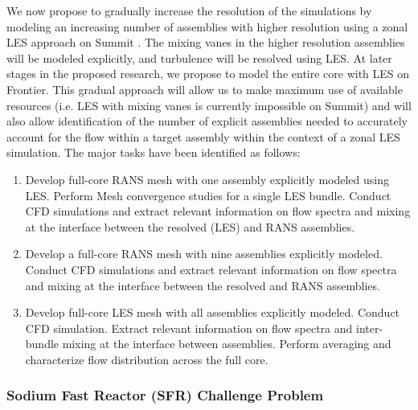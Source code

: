 We now propose to gradually increase the resolution of the simulations by modeling an increasing number of assemblies with higher resolution using a zonal LES approach on Summit \cite{menter2012global}. The mixing vanes in the higher resolution assemblies will be modeled explicitly, and turbulence will be resolved using LES. At later stages in the proposed research, we propose to model the entire core with LES on Frontier. This gradual approach will allow us to make maximum use of available resources (i.e. LES with mixing vanes is currently impossible on Summit) and will also allow identification of the number of explicit assemblies needed to accurately account for the flow within a target assembly within the context of a zonal LES simulation. The major tasks have been identified as follows:

\vspace{-.15in}
\begin{enumerate}[label=\textbf{\Roman*}]
\item Develop full-core RANS mesh with one assembly explicitly modeled using
LES.  Perform Mesh convergence studies for a single LES bundle. Conduct CFD
simulations and extract relevant information on flow spectra and mixing at the
interface between the resolved (LES) and RANS assemblies.
\item Develop a full-core RANS mesh with nine assemblies explicitly modeled. Conduct CFD simulations and extract relevant information on flow spectra and mixing at the interface 
between the resolved and RANS assemblies.
\item Develop full-core LES mesh with all assemblies explicitly modeled.
Conduct CFD simulation. Extract relevant information on flow spectra and 
inter-bundle mixing at the interface between assemblies. Perform averaging and
characterize flow distribution across the full core.
\end{enumerate}
\vspace{-.15in}


\vspace{-.25in}
\subsubsection{Sodium Fast Reactor (SFR) Challenge Problem}
\vspace{-.2in}

